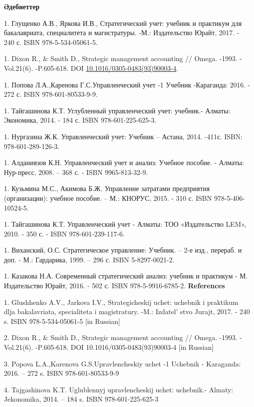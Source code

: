 {\bfseries Әдебиеттер}


1. Глущенко А.В., Яркова И.В., Стратегический учет: учебник и практикум
для бакалавриата, специалитета и магистратуры. -М.: Издательство
Юрайт, 2017. - 240 с. ISBN 978-5-534-05061-5.

1. Dixon R., \& Smith D., Strategic management accounting // Omega.
-1993. -Vol.21(6). -P.605-618. DOI
\href{https://doi.org/10.1016/0305-0483(93)90003-4}{10.1016/0305-0483(93)90003-4}.

1. Попова Л.А.,Каренова Г.С.Управленческий учет -1 Учебник -Караганда:
2016. - 272 с. ISBN 978-601-80533-9-9.

1. Тайгашинова К.Т. Углубленный управленческий учет: учебник.- Алматы:
Экономика, 2014. - 184 с. ISBN 978-601-225-625-3.

1. Нургазина Ж.К. Управленческий учет: Учебник -- Астана, 2014. -411с.
ISBN: 978-601-289-126-3.

1. Алданиязов К.Н. Управленческий учет и анализ: Учебное пособие. -
Алматы: Нур-пресс, 2008. -- 368 с. - ISBN 9965-813-32-9.

1. Кузьмина М.С., Акимова Б.Ж. Управление затратами предприятия
(организации): учебное пособие. -- М.: КНОРУС, 2015. - 310 с. ISBN
978-5-406-10524-5.

1. Тайгашинова К.Т. Управленческий учет - Алматы: ТОО «Издательство LEM»,
2010. - 350 с. - ISBN 978-601-239-117-6.

1. Виханский, О.С. Стратегическое управление: Учебник. -- 2-е изд.,
перераб. и доп. - М.: Гардарика, 1999. -- 296 с. ISBN 5-8297-0021-2.

1. Казакова Н.А. Современный стратегический анализ: учебник и практикум -
М. Издательство Юрайт, 2016. - 502 с. ISBN 978-5-9916-6785-2.
{\bfseries References}

1. Glushhenko A.V., Jarkova I.V., Strategicheskij uchet: uchebnik i
praktikum dlja bakalavriata, specialiteta i magistratury. -M.:
Izdatel' stvo Jurajt, 2017. - 240 s. ISBN
978-5-534-05061-5 {[}in Russian{]}

2. Dixon R., \& Smith D., Strategic management accounting // Omega.
-1993. -Vol.21(6). -P.605-618. DOI 10.1016/0305-0483(93)90003-4 {[}in
Russian{]}

3. Popova L.A.,Karenova G.S.Upravlencheskiy uchet -1 Uchebnik -
Karaganda: 2016. -- 272 s. ISBN 978-601-80533-9-9

4. Tajgashinova K.T. Uglublennyj upravlencheskij uchet: uchebnik.-
Almaty: Jekonomika, 2014. -- 184 s. ISBN 978-601-225-625-3

